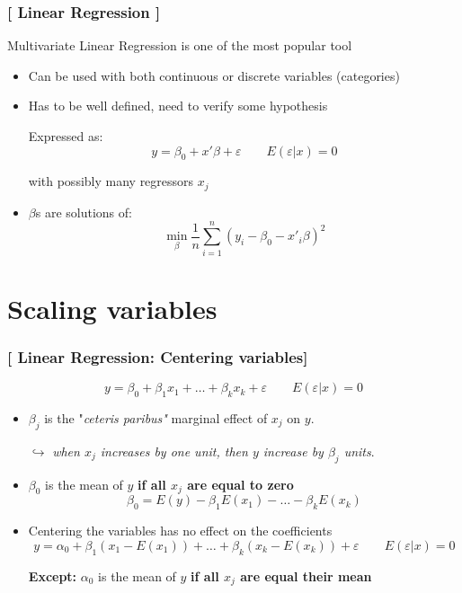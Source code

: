 \documentclass[xcolor=x11names,compress, aspectratio=169]{beamer}
\renewcommand{\(}{\begin{columns}}
\renewcommand{\)}{\end{columns}}
\newcommand{\<}[1]{\begin{column}{#1}}
\renewcommand{\>}{\end{column}}
\begin{document}
\begin{frame} %

\frametitle{\textcolor{brique}{[ Linear Regression ]}}
Multivariate Linear Regression is one of the most popular tool
\pause
\begin{itemize}[<+->]
  \item Can be used with both continuous or discrete variables (categories)
  \item Has to be well defined, need to verify some hypothesis
  \item[] Expressed as: $$
  y  = \beta_0 + x'\beta + \varepsilon \qquad  E (\varepsilon|x)  = 0
  $$
  \item[] with possibly many regressors $x_j$
  \item $\beta$s are solutions of:
$$
\min_{\beta} \frac{1}{n}
\sum_{i=1}^{n}{ \left( y_i - \beta_0 - x'_i\beta\right)^{2} } 
$$
\end{itemize}
\end{frame}

\section{Scaling variables}

\begin{frame} %
\frametitle{\textcolor{brique}{[ Linear Regression: Centering variables]}}
$$
y  = \beta_0 + \beta_1 x_1 + \ldots + \beta_{k} x_k + \varepsilon \qquad E (\varepsilon|x)  = 0
$$
\pause
\begin{itemize}[<+->]
  \item $\beta_j$ is the "\textit{ceteris paribus"} marginal effect of $x_j$ on $y$.
  \item[$\hookrightarrow$]  \textit{when  $x_j$  increases by one unit, then $y$  increase by $\beta_j$ units}.
 \item $\beta_0$ is the mean of $y$ \textbf{if all $x_j$ are equal to zero}
  $$
    \beta_0  = E(y) - \beta_1 E(x_1) - \ldots - \beta_{k} E(x_k)  $$
  \item Centering the variables has no effect on the coefficients
     $$
   y = \alpha_0 + \beta_1 (x_1-E(x_1)) + \ldots + \beta_{k} (x_k-E(x_k))  + \varepsilon \qquad E (\varepsilon|x)  = 0
    $$
  \item[\textbf{Except:}] $ \alpha_0$  is the mean of $y$ \textbf{if all $x_j$ are equal their mean}
\end{itemize}
\end{frame}
\end{document}
